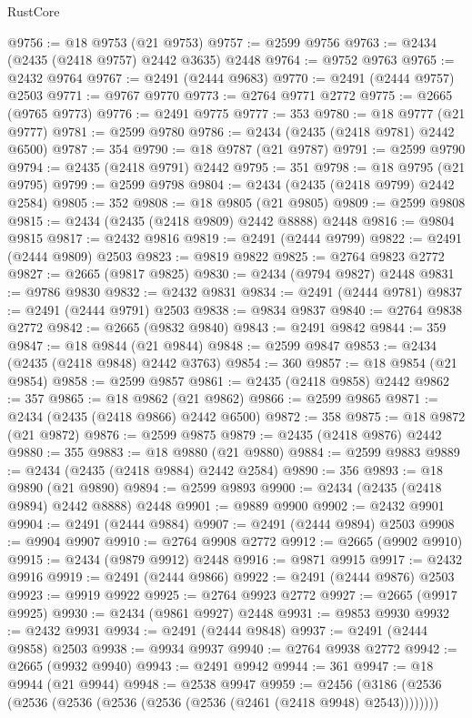 \begin{lexlean}{RustCore}
\begin{coremodule}
@9756 := @18 @9753 (@21 @9753)
@9757 := @2599 @9756
@9763 := @2434 (@2435 (@2418 @9757) @2442 @3635) @2448
@9764 := @9752 @9763
@9765 := @2432 @9764
@9767 := @2491 (@2444 @9683)
@9770 := @2491 (@2444 @9757) @2503
@9771 := @9767 @9770
@9773 := @2764 @9771 @2772
@9775 := @2665 (@9765 @9773)
@9776 := @2491 @9775
@9777 := 353
@9780 := @18 @9777 (@21 @9777)
@9781 := @2599 @9780
@9786 := @2434 (@2435 (@2418 @9781) @2442 @6500)
@9787 := 354
@9790 := @18 @9787 (@21 @9787)
@9791 := @2599 @9790
@9794 := @2435 (@2418 @9791) @2442
@9795 := 351
@9798 := @18 @9795 (@21 @9795)
@9799 := @2599 @9798
@9804 := @2434 (@2435 (@2418 @9799) @2442 @2584)
@9805 := 352
@9808 := @18 @9805 (@21 @9805)
@9809 := @2599 @9808
@9815 := @2434 (@2435 (@2418 @9809) @2442 @8888) @2448
@9816 := @9804 @9815
@9817 := @2432 @9816
@9819 := @2491 (@2444 @9799)
@9822 := @2491 (@2444 @9809) @2503
@9823 := @9819 @9822
@9825 := @2764 @9823 @2772
@9827 := @2665 (@9817 @9825)
@9830 := @2434 (@9794 @9827) @2448
@9831 := @9786 @9830
@9832 := @2432 @9831
@9834 := @2491 (@2444 @9781)
@9837 := @2491 (@2444 @9791) @2503
@9838 := @9834 @9837
@9840 := @2764 @9838 @2772
@9842 := @2665 (@9832 @9840)
@9843 := @2491 @9842
@9844 := 359
@9847 := @18 @9844 (@21 @9844)
@9848 := @2599 @9847
@9853 := @2434 (@2435 (@2418 @9848) @2442 @3763)
@9854 := 360
@9857 := @18 @9854 (@21 @9854)
@9858 := @2599 @9857
@9861 := @2435 (@2418 @9858) @2442
@9862 := 357
@9865 := @18 @9862 (@21 @9862)
@9866 := @2599 @9865
@9871 := @2434 (@2435 (@2418 @9866) @2442 @6500)
@9872 := 358
@9875 := @18 @9872 (@21 @9872)
@9876 := @2599 @9875
@9879 := @2435 (@2418 @9876) @2442
@9880 := 355
@9883 := @18 @9880 (@21 @9880)
@9884 := @2599 @9883
@9889 := @2434 (@2435 (@2418 @9884) @2442 @2584)
@9890 := 356
@9893 := @18 @9890 (@21 @9890)
@9894 := @2599 @9893
@9900 := @2434 (@2435 (@2418 @9894) @2442 @8888) @2448
@9901 := @9889 @9900
@9902 := @2432 @9901
@9904 := @2491 (@2444 @9884)
@9907 := @2491 (@2444 @9894) @2503
@9908 := @9904 @9907
@9910 := @2764 @9908 @2772
@9912 := @2665 (@9902 @9910)
@9915 := @2434 (@9879 @9912) @2448
@9916 := @9871 @9915
@9917 := @2432 @9916
@9919 := @2491 (@2444 @9866)
@9922 := @2491 (@2444 @9876) @2503
@9923 := @9919 @9922
@9925 := @2764 @9923 @2772
@9927 := @2665 (@9917 @9925)
@9930 := @2434 (@9861 @9927) @2448
@9931 := @9853 @9930
@9932 := @2432 @9931
@9934 := @2491 (@2444 @9848)
@9937 := @2491 (@2444 @9858) @2503
@9938 := @9934 @9937
@9940 := @2764 @9938 @2772
@9942 := @2665 (@9932 @9940)
@9943 := @2491 @9942
@9944 := 361
@9947 := @18 @9944 (@21 @9944)
@9948 := @2538 @9947
@9959 := @2456 (@3186 (@2536 (@2536 (@2536 (@2536 (@2536 (@2536 (@2461 (@2418 @9948) @2543))))))))

\end{coremodule}
\end{lexlean}
